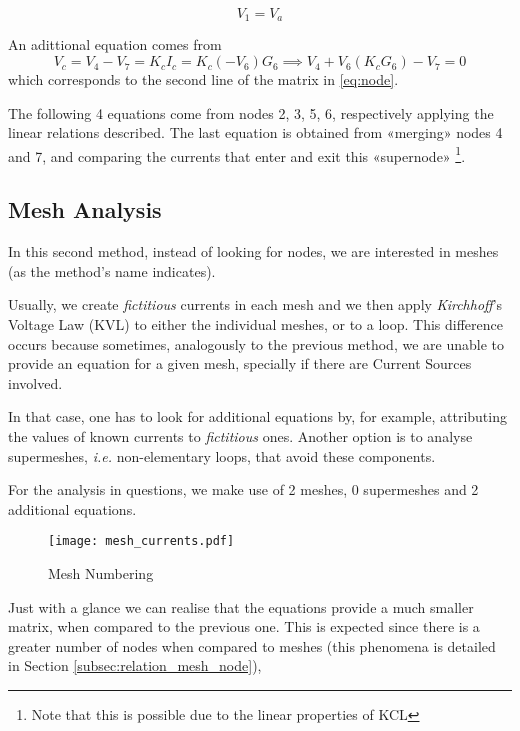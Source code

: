 \begin{equation}
    V_1 = V_a     
\end{equation}

\noindent An adittional equation comes from
\begin{equation}
    V_c = V_4 - V_7 = K_cI_c = K_c(-V_6)G_6 \implies V_4+V_6(K_cG_6)-V_7=0
\end{equation}
which corresponds to the second line of the matrix in \ref{eq:node}.

The following 4 equations come from nodes 2, 3, 5, 6, respectively applying the linear relations described.
The last equation is obtained from «merging» nodes 4 and 7, and comparing the currents that enter and exit this «supernode» \footnote{Note that this is possible due to the linear properties of KCL}.

\subsection{Mesh Analysis}
\label{subsec:mesh_analysis}

In this second method, instead of looking for nodes, we are interested in meshes (as the method's name indicates).

Usually, we create \textit{fictitious} currents in each mesh and we then apply \textit{Kirchhoff}'s Voltage Law (KVL) to either the individual meshes, or to a loop. 
This difference occurs because sometimes, analogously to the previous method, we are unable to provide an equation for a given mesh, specially if there are Current Sources involved. 

In that case, one has to look for additional equations by, for example, attributing the values of known currents to \textit{fictitious} ones. Another option is to analyse supermeshes, \textit{i.e.} non-elementary loops, that avoid these components.

For the analysis in questions, we make use of 2 meshes, 0 supermeshes and 2 additional equations.


\begin{figure}[h] \centering
\texttt{[image: mesh\_currents.pdf]}
\caption{Mesh Numbering}
\label{fig:mesh_numbering}
\end{figure}
\vspace{3cm}
\pagebreak

Just with a glance we can realise that the equations provide a much smaller matrix, when compared to the previous one. This is expected since there is a greater number of nodes when compared to meshes (this phenomena is detailed in Section \ref{subsec:relation_mesh_node}),

